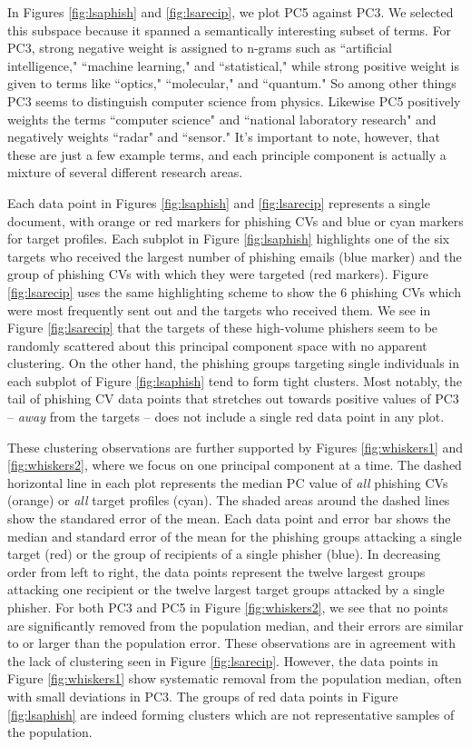 \documentclass[conference]{IEEEtran}
\begin{document}
In Figures \ref{fig:lsaphish} and \ref{fig:lsarecip}, we plot PC5 against PC3.  We selected this subspace because it spanned a semantically interesting subset of terms.  For PC3,
strong negative weight is assigned to n-grams such as ``artificial intelligence," ``machine learning," and ``statistical," while strong positive weight is given to terms 
like ``optics," ``molecular,"
and ``quantum."  So among other things
 PC3 seems to distinguish computer science from physics.  Likewise PC5 positively weights the terms ``computer science" and ``national laboratory research" and 
negatively weights ``radar" and ``sensor."  It's important to note, however, that these are just a few example terms, and each principle component is actually a mixture of several 
different research areas. 

Each data point in Figures \ref{fig:lsaphish} and \ref{fig:lsarecip} represents a single document, with orange or red markers for phishing CVs and blue or cyan markers for target profiles.  Each subplot in Figure 
\ref{fig:lsaphish} highlights one of the six targets who received the largest number of phishing emails (blue marker) and the group of phishing CVs with which they were targeted (red markers).  Figure 
\ref{fig:lsarecip} uses the same highlighting scheme to show the 6 phishing CVs which were most frequently sent out and the targets who received them.  We see in Figure \ref{fig:lsarecip} that the targets of 
these high-volume phishers seem to be randomly scattered about this principal component space with no apparent clustering.  On the other hand, the phishing groups targeting single individuals in each subplot 
of Figure \ref{fig:lsaphish} tend to form tight clusters.  Most notably, the tail of phishing CV data points that stretches out towards positive values of PC3 -- \emph{away} from the targets -- does not include a 
single red data point in any plot.

These clustering observations are further supported by Figures \ref{fig:whiskers1} and \ref{fig:whiskers2}, where we focus on one principal component at a time.  The dashed horizontal line in each plot 
represents the median PC value of \emph{all} phishing CVs (orange) or \emph{all} target profiles (cyan).  The shaded areas around the dashed lines show the standared error of the mean.  Each data point and 
error bar shows the median and standard error of the mean for the phishing groups attacking a single target (red) or the group of recipients of a single phisher (blue).  In decreasing order from left to 
right, the data points represent the twelve largest groups attacking one recipient or the twelve largest target groups attacked by a single phisher.  For both PC3 and PC5 in Figure \ref{fig:whiskers2}, we see that 
no points are significantly removed from the population median, and their errors are similar to or larger than the population error.  These observations are in agreement with the lack of clustering seen in Figure 
\ref{fig:lsarecip}.  However, the data points in Figure \ref{fig:whiskers1} show systematic removal from the population median, often with small deviations in PC3.  The groups of red data points in Figure 
\ref{fig:lsaphish} are indeed forming clusters which are not representative samples of the population.
\end{document}
